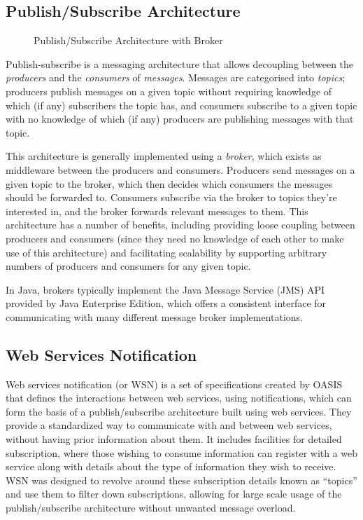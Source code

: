 \documentclass[a4paper, 12pt, twoside]{article}
\begin{document}
\subsection{Publish/Subscribe Architecture}
\label{sec:bg_pubsub}

\begin{figure}
\begin{center}
\def\svgwidth{\columnwidth}

\end{center}
\caption{Publish/Subscribe Architecture with Broker}
\label{fig:pubsub}
\end{figure}

Publish-subscribe is a messaging architecture that allows decoupling between the \emph{producers} and the \emph{consumers} of \emph{messages}. Messages are categorised into \emph{topics}; producers publish messages on a given topic without requiring knowledge of which (if any) subscribers the topic has, and consumers subscribe to a given topic with no knowledge of which (if any) producers are publishing messages with that topic.

This architecture is generally implemented using a \emph{broker}, which exists as middleware between the producers and consumers. Producers send messages on a given topic to the broker, which then decides which consumers the messages should be forwarded to. Consumers subscribe via the broker to topics they’re interested in, and the broker forwards relevant messages to them. This architecture has a number of benefits, including providing loose coupling between producers and consumers (since they need no knowledge of each other to make use of this architecture) and facilitating scalability by supporting arbitrary numbers of producers and consumers for any given topic.

In Java, brokers typically implement the Java Message Service (JMS) API provided by Java Enterprise Edition, which offers a consistent interface for communicating with many different message broker implementations.

\subsection{Web Services Notification}
\label{sec:bg_wsn}

Web services notification (or WSN) is a set of specifications created by OASIS that defines the interactions between web services, using notifications, which can form the basis of a publish/subscribe architecture built using web services. They provide a standardized way to communicate with and between web services, without having prior information about them. It includes facilities for detailed subscription, where those wishing to consume information can register with a web service along with details about the type of information they wish to receive. WSN was designed to revolve around these subscription details known as ``topics'' and use them to filter down subscriptions, allowing for large scale usage of the publish/subscribe architecture without unwanted message overload.
\end{document}
